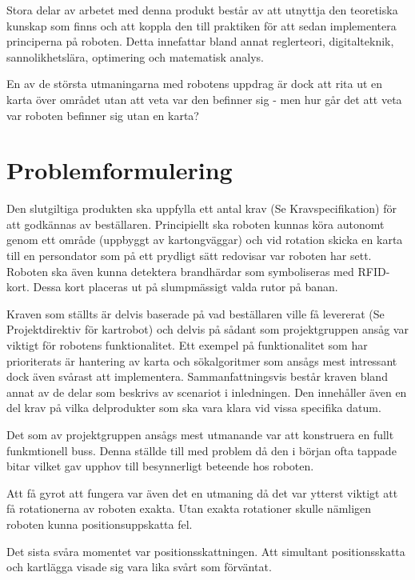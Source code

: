 \documentclass[a4paper,12pt,fleqn]{article}
\begin{document}
Stora delar av arbetet med denna produkt består av att utnyttja den teoretiska kunskap som finns och att koppla den till praktiken för att sedan implementera principerna på roboten. 
Detta innefattar bland annat reglerteori, digitalteknik, sannolikhetslära, optimering och matematisk analys.

En av de största utmaningarna med robotens uppdrag är dock att rita ut en karta över området utan att veta var den befinner sig - men hur går det att veta var roboten befinner sig utan en karta? 

\section{Problemformulering}

Den slutgiltiga produkten ska uppfylla ett antal krav (Se Kravspecifikation) för att godkännas av beställaren. Principiellt ska roboten kunnas köra autonomt genom ett område (uppbyggt av kartongväggar) och vid rotation skicka en karta till en persondator som på ett prydligt sätt redovisar var roboten har sett. Roboten ska även kunna detektera brandhärdar som symboliseras med RFID-kort. Dessa kort placeras ut på slumpmässigt valda rutor på banan. 

Kraven som ställts är delvis baserade på vad beställaren ville få levererat (Se Projektdirektiv för kartrobot) och delvis på sådant som projektgruppen ansåg var viktigt för robotens funktionalitet. Ett exempel på funktionalitet som har prioriterats är hantering av karta och sökalgoritmer som ansågs mest intressant dock även svårast att implementera. 
Sammanfattningsvis består kraven bland annat av de delar som beskrivs av scenariot i inledningen. Den innehåller även en del krav på vilka delprodukter som ska vara klara vid vissa specifika datum.

Det som av projektgruppen ansågs mest utmanande var att konstruera en fullt funkmtionell buss. Denna ställde till med problem då den i början ofta tappade bitar vilket gav upphov till besynnerligt beteende hos roboten. 

Att få gyrot att fungera var även det en utmaning då det var ytterst viktigt att få rotationerna av roboten exakta. Utan exakta rotationer skulle nämligen roboten kunna positionsuppskatta fel.

Det sista svåra momentet var positionsskattningen. Att simultant positionsskatta och kartlägga visade sig vara lika svårt som förväntat.
\end{document}
